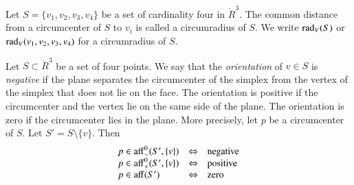 \begin{tarskidata}
\begin{tarski}

\begin{definition}  
Let $S=\{v_1,v_2,v_3,v_4\}$ be 
a set of cardinality four in $\ring{R}^3$.
The common distance from a circumcenter of $S$ to $v_i$ is called a
circumradius of $S$.  We write
$\operatorname{rad}_V(S)$ or $\operatorname{rad}_V(v_1,v_2,v_3,v_4)$ for a circumradius of $S$.
\end{definition}
\end{tarski}


\begin{tarski}

\begin{definition}[orientation] 
Let $S\subset\ring{R}^3$ be a set of four points.
We say that the {\it orientation\/} of $v\in S$ is
{\it negative} if the plane separates the
circumcenter of the simplex from the vertex of the simplex that
does not lie on the face.  The orientation is positive if the
circumcenter and the vertex lie on the same side of the plane. The
orientation is zero if the circumcenter lies in the plane.
More precisely, let $p$ be a circumcenter of $S$.  Let $S'=S\setminus\{v\}$.  
Then
   $$
   \begin{array}{lll}
     p\in {\operatorname{aff}}_-^0(S',\{v\}) &\Leftrightarrow &\text{negative}\\
     p\in {\operatorname{aff}}_+^0(S',\{v\}) &\Leftrightarrow &\text{positive}\\
     p\in {\operatorname{aff}} (S') &\Leftrightarrow &\text{zero}\\
     \end{array}
   $$
\end{definition}
\end{tarski}



\begin{tarski}


\end{tarski}
\end{tarskidata}
